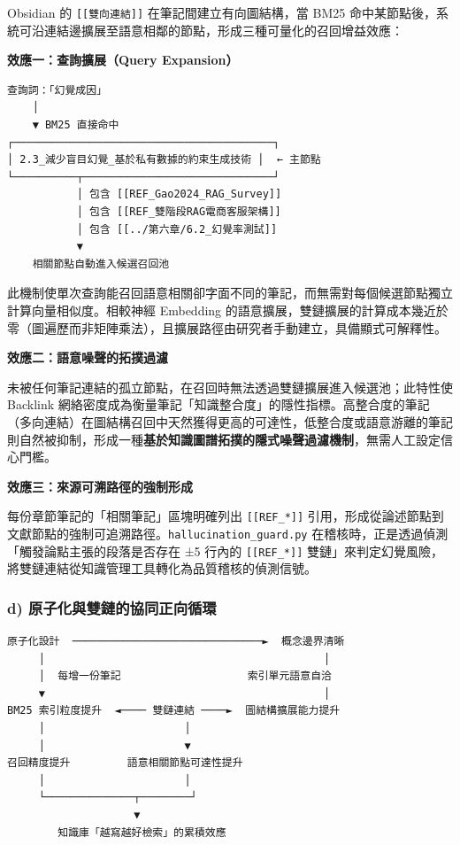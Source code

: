 Obsidian 的 \texttt{{[}{[}雙向連結{]}{]}} 在筆記間建立有向圖結構，當
BM25
命中某節點後，系統可沿連結邊擴展至語意相鄰的節點，形成三種可量化的召回增益效應：

\textbf{效應一：查詢擴展（Query Expansion）}

\begin{verbatim}
查詢詞：「幻覺成因」
    │
    ▼ BM25 直接命中
┌─────────────────────────────────────────┐
│ 2.3_減少盲目幻覺_基於私有數據的約束生成技術 │  ← 主節點
└──────────┬──────────────────────────────┘
           │ 包含 [[REF_Gao2024_RAG_Survey]]
           │ 包含 [[REF_雙階段RAG電商客服架構]]
           │ 包含 [[../第六章/6.2_幻覺率測試]]
           ▼
    相關節點自動進入候選召回池
\end{verbatim}

此機制使單次查詢能召回語意相關卻字面不同的筆記，而無需對每個候選節點獨立計算向量相似度。相較神經
Embedding
的語意擴展，雙鏈擴展的計算成本幾近於零（圖遍歷而非矩陣乘法），且擴展路徑由研究者手動建立，具備顯式可解釋性。

\textbf{效應二：語意噪聲的拓撲過濾}

未被任何筆記連結的孤立節點，在召回時無法透過雙鏈擴展進入候選池；此特性使
Backlink
網絡密度成為衡量筆記「知識整合度」的隱性指標。高整合度的筆記（多向連結）在圖結構召回中天然獲得更高的可達性，低整合度或語意游離的筆記則自然被抑制，形成一種\textbf{基於知識圖譜拓撲的隱式噪聲過濾機制}，無需人工設定信心門檻。

\textbf{效應三：來源可溯路徑的強制形成}

每份章節筆記的「相關筆記」區塊明確列出 \texttt{{[}{[}REF\_*{]}{]}}
引用，形成從論述節點到文獻節點的強制可追溯路徑。\texttt{hallucination\_guard.py}
在稽核時，正是透過偵測「觸發論點主張的段落是否存在 ±5 行內的
\texttt{{[}{[}REF\_*{]}{]}}
雙鏈」來判定幻覺風險，將雙鏈連結從知識管理工具轉化為品質稽核的偵測信號。

\subsubsection{d)
原子化與雙鏈的協同正向循環}\label{d-ux539fux5b50ux5316ux8207ux96d9ux93c8ux7684ux5354ux540cux6b63ux5411ux5faaux74b0}

\begin{verbatim}
原子化設計  ──────────────────────────────►  概念邊界清晰
     │                                            │
     │  每增一份筆記                    索引單元語意自洽
     ▼                                            │
BM25 索引粒度提升  ◄──── 雙鏈連結 ────►  圖結構擴展能力提升
     │                      │
     │                      ▼
召回精度提升         語意相關節點可達性提升
     │                      │
     └──────────────┬────────┘
                    ▼
        知識庫「越寫越好檢索」的累積效應
\end{verbatim}

